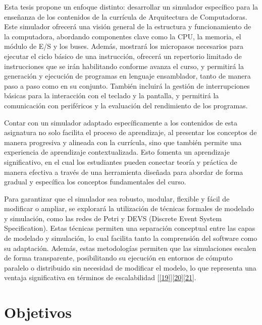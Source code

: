\documentclass[12pt,oneside]{templates/unerthesis}
\begin{document}
Esta tesis propone un enfoque distinto: desarrollar un simulador específico para la enseñanza de los contenidos de la currícula de Arquitectura de Computadoras. Este simulador ofrecerá una visión general de la estructura y funcionamiento de la computadora, abordando componentes clave como la CPU, la memoria, el módulo de E/S y los buses. Además, mostrará los micropasos necesarios para ejecutar el ciclo básico de una instrucción, ofrecerá un repertorio limitado de instrucciones que se irán habilitando conforme avanza el curso, y permitirá la generación y ejecución de programas en lenguaje ensamblador, tanto de manera paso a paso como en su conjunto. También incluirá la gestión de interrupciones básicas para la interacción con el teclado y la pantalla, y permitirá la comunicación con periféricos y la evaluación del rendimiento de los programas.

Contar con un simulador adaptado específicamente a los contenidos de esta asignatura no solo facilita el proceso de aprendizaje, al presentar los conceptos de manera progresiva y alineada con la currícula, sino que también permite una experiencia de aprendizaje contextualizada. Esto fomenta un aprendizaje significativo, en el cual los estudiantes pueden conectar teoría y práctica de manera efectiva a través de una herramienta diseñada para abordar de forma gradual y específica los conceptos fundamentales del curso.

Para garantizar que el simulador sea robusto, modular, flexible y fácil de modificar o ampliar, se explorará la utilización de técnicas formales de modelado y simulación, como las redes de Petri y DEVS (Discrete Event System Specification). Estas técnicas permiten una separación conceptual entre las capas de modelado y simulación, lo cual facilita tanto la comprensión del software como su adaptación. Además, estas metodologías permiten que las simulaciones escalen de forma transparente, posibilitando su ejecución en entornos de cómputo paralelo o distribuido sin necesidad de modificar el modelo, lo que representa una ventaja significativa en términos de escalabilidad {[}\protect\hyperlink{ref-peterson_petri_1981}{{[}19{]}}{]}\protect\hyperlink{ref-zeigler_theory_2000}{{[}20{]}}\protect\hyperlink{ref-zeigler_theory_2018}{{[}21{]}}.

\hypertarget{objetivos}{%
\section{Objetivos}\label{objetivos}}
\end{document}
